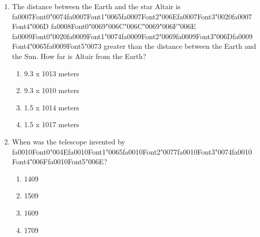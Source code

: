\documentclass[12pt]{article}
\begin{document}
\begin{enumerate}[label=\arabic*.]
Moon?
\begin{enumerate}[label=(\alph*)]
    \item The Moon split from the Earth due to tidal forces.
    \item The Moon was captured into Earth orbit.
    \item The Earth and Moon co-accreted in the solar nebula.
    \item Earth was rotating so rapidly that the Moon split from it.
\end{enumerate}
\item The distance between the Earth and the star Altair is {\csname fa0007Font0\endcsname\char"0074}{\csname fa0007Font1\endcsname\char"0065}{\csname fa0007Font2\endcsname\char"006E}{\csname fa0007Font3\endcsname\char"0020}{\csname fa0007Font4\endcsname\char"006D} {\csname fa0008Font0\endcsname\char"0069}{\char"006C}{\char"006C}{\char"0069}{\char"006F}{\char"006E} {\csname fa0009Font0\endcsname\char"0020}{\csname fa0009Font1\endcsname\char"0074}{\csname fa0009Font2\endcsname\char"0069}{\csname fa0009Font3\endcsname\char"006D}{\csname fa0009Font4\endcsname\char"0065}{\csname fa0009Font5\endcsname\char"0073} greater than the
distance between the Earth and the Sun. How far is Altair from the Earth?
\begin{enumerate}[label=(\alph*)]
    \item 9.3 x 1013 meters
    \item 9.3 x 1010 meters
    \item 1.5 x 1014 meters
    \item 1.5 x 1017 meters
\end{enumerate}
\item When was the telescope invented by {\csname fa0010Font0\endcsname\char"004E}{\csname fa0010Font1\endcsname\char"0065}{\csname fa0010Font2\endcsname\char"0077}{\csname fa0010Font3\endcsname\char"0074}{\csname fa0010Font4\endcsname\char"006F}{\csname fa0010Font5\endcsname\char"006E}?
\begin{enumerate}[label=(\alph*)]
    \item 1409
    \item 1509
    \item 1609
    \item 1709
\end{enumerate}
\end{enumerate}
\end{document}
